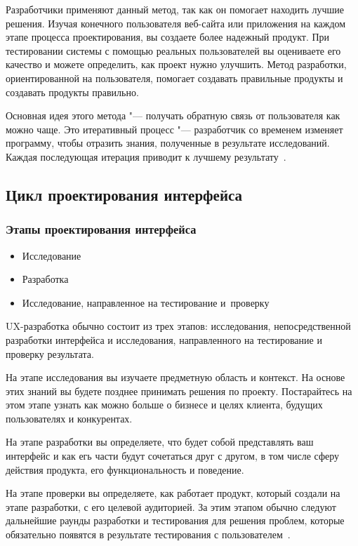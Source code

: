 \documentclass{../industrial-development}
\begin{document}
Разработчики применяют данный метод, так как он помогает находить лучшие решения. Изучая конечного пользователя веб-сайта или приложения на каждом этапе процесса проектирования, вы создаете более надежный продукт. При тестировании системы с помощью реальных пользователей вы оцениваете его качество и можете определить, как проект нужно улучшить. Метод разработки, ориентированной на пользователя, помогает создавать правильные продукты и создавать продукты правильно.

Основная идея этого метода "--- получать обратную связь от пользователя как можно чаще. Это итеративный процесс "--- разработчик со временем изменяет программу, чтобы отразить знания, полученные в результате исследований. Каждая последующая итерация приводит к лучшему результату~\cite[с.~40--41]{Allen}.

\subsection{Цикл проектирования интерфейса}

\begin{frame} \frametitle{Этапы проектирования интерфейса}
  \begin{itemize}
   \item Исследование
   \item Разработка
   \item Исследование, направленное на тестирование и~проверку
  \end{itemize}
\end{frame}

\lecturenotes

UX-разработка обычно состоит из трех этапов: исследования, непосредственной разработки интерфейса и исследования, направленного на тестирование и проверку результата.

На этапе исследования вы изучаете предметную область и контекст. На основе этих знаний вы будете позднее принимать решения по проекту. Постарайтесь на этом этапе узнать как можно больше о бизнесе и целях клиента, будущих пользователях и конкурентах.

На этапе разработки вы определяете, что будет собой представлять ваш интерфейс и как егь части будут сочетаться друг с другом, в том числе сферу действия продукта, его функциональность и поведение.

На этапе проверки вы определяете, как работает продукт, который создали на этапе разработки, с его целевой аудиторией. За этим этапом обычно следуют дальнейшие раунды разработки и тестирования для решения проблем, которые обязательно появятся в результате тестирования с пользователем~\cite[с.~61--62]{Allen}.
\end{document}
